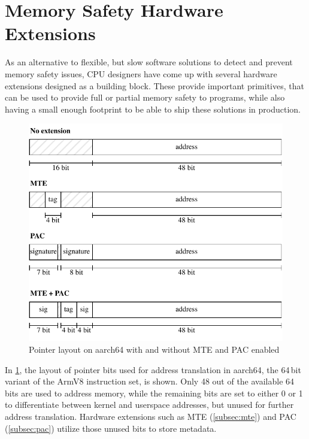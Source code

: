 \section{Memory Safety Hardware Extensions}
\label{sec:memory-safety-hardware-extensions}

As an alternative to flexible, but slow software solutions to detect and prevent memory safety issues, CPU designers have come up with several hardware extensions designed as a building block.
These provide important primitives, that can be used to provide full or partial memory safety to programs, while also having a small enough footprint to be able to ship these solutions in production.

\begin{figure}[t]
    \centering
    \includegraphics[scale=1]{figures/build/pointer-aarch64}
    \caption{Pointer layout on aarch64 with and without MTE and PAC enabled}
    \label{fig:aarch64-pointer}
\end{figure}

In \cref{fig:aarch64-pointer}, the layout of pointer bits used for address translation in aarch64, the 64\,bit variant of the ArmV8 instruction set, is shown.
Only 48 out of the available 64\,bits are used to address memory, while the remaining bits are set to either 0 or 1 to differentiate between kernel and userspace addresses, but unused for further address translation.
 Hardware extensions such as MTE (\cref{subsec:mte}) and PAC (\cref{subsec:pac}) utilize those unused bits to store metadata.

